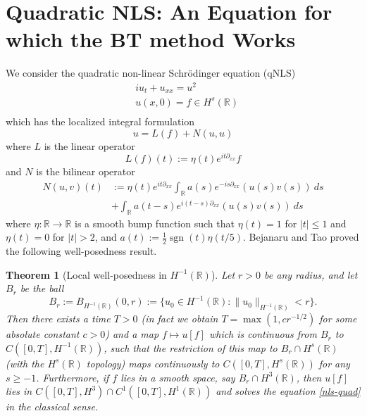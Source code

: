 \documentclass[12pt,reqno]{amsart}
\numberwithin{equation}{section}  %
\newcommand{\rr}{\mathbb{R}}
\newtheorem{theorem}{Theorem}[section]
\def\sgn{\operatorname{sgn}}
\newcommand{\R}{\mathbb{R}}
\begin{document}
\section{Quadratic NLS: An Equation for which the BT method Works}
%
  We consider the quadratic non-linear Schr\"odinger equation (qNLS)
\begin{equation}\label{nls-quad}
\begin{split}
& i u_t + u_{xx} = u^2\\
& u(x, 0) = f \in H^s(\R) \\
\end{split}
\end{equation}
which has the localized integral formulation 
\begin{equation}\label{uln-2}
 u = L(f) + N(u,u)
 \end{equation}
where $L$ is the linear operator
\begin{equation}\label{Ldef}
  L(f)(t) := \eta(t) e^{it\partial_{xx}} f
\end{equation}
and $N$ is the bilinear operator
\begin{equation}\label{Ndef}
\begin{split}
N(u,v)(t) &:=
\eta(t) e^{it\partial_{xx}} \int_\R a(s) e^{-is\partial_{xx}}(u(s)v(s))\ ds\\
&+ \int_\R a(t-s) e^{i(t-s)\partial_{xx}}(u(s) v(s))\ ds
\end{split}
\end{equation}
%
where $\eta: \R \to \R$ is a smooth bump function such that $\eta(t) = 1$ for
$|t| \leq 1$ and $\eta(t) = 0$ for $|t| > 2$, and $a(t) := \frac{1}{2}
\sgn(t)\eta(t/5)$.  
%
Bejanaru and Tao proved the following well-posedness result.
\begin{theorem}[Local well-posedness in $H^{-1}(\R)$]\label{lwp}
Let $r > 0$ be any radius, and let $B_r$ be the ball
$$ B_r := B_{H^{-1}(\R)}(0,r) := \{ u_0 \in H^{-1}(\R): \| u_0 \|_{H^{-1}(\R)} < r \}.$$
Then there exists a time $T > 0$ (in fact we obtain $T = \max(1, c r^{-1/2} )$ for some absolute constant $c>0$)
and a map $f \mapsto u[f]$ which is continuous from $B_r$ to $C([0,T],
H^{-1}(\rr))$, such that the
restriction of this map to $B_r \cap H^s(\R)$ (with the $H^s(\R)$ topology) maps continuously 
to $C([0,T], H^s(\rr))$ for any $s \geq -1$.  Furthermore, if $f$ lies in
a smooth space, say $B_r \cap H^3(\R)$, then $u[f]$ lies in $C([0, T], H^3) \cap
C^1([0,T], H^1(\rr))$ and
solves the equation \eqref{nls-quad} in the classical sense.   
\end{theorem}
\end{document}
